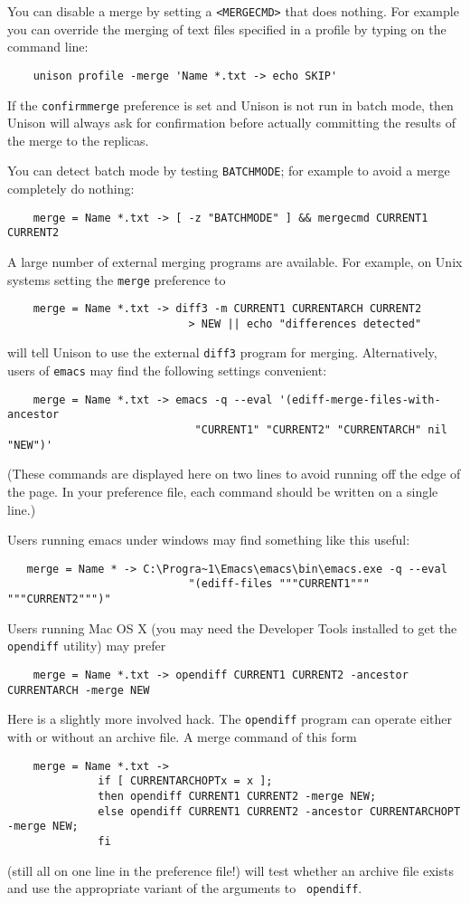 \documentclass{article}
\begin{document}
You can disable a merge by setting a \verb|<MERGECMD>| that does nothing.  For
example you can override the merging of text files specified in a profile by
typing on the command line:
\begin{verbatim}
    unison profile -merge 'Name *.txt -> echo SKIP'
\end{verbatim}

If the \verb|confirmmerge| preference is set and Unison is not run in
batch mode, then Unison will always ask for confirmation before
actually committing the results of the merge to the replicas.

You can detect batch mode by testing \verb|BATCHMODE|; for
example to avoid a merge completely do nothing:
\begin{verbatim}
    merge = Name *.txt -> [ -z "BATCHMODE" ] && mergecmd CURRENT1 CURRENT2
\end{verbatim}

A large number of external merging programs are available.
For example, on Unix systems setting the \verb|merge| preference to
\begin{verbatim}
    merge = Name *.txt -> diff3 -m CURRENT1 CURRENTARCH CURRENT2
                            > NEW || echo "differences detected"
\end{verbatim}
\noindent
will tell Unison to use the external \verb|diff3| program for merging.
%
Alternatively, users of \verb|emacs| may find the following settings convenient:
\begin{verbatim}
    merge = Name *.txt -> emacs -q --eval '(ediff-merge-files-with-ancestor
                             "CURRENT1" "CURRENT2" "CURRENTARCH" nil "NEW")'
\end{verbatim}
\noindent
(These commands are displayed here on two lines to avoid running off the
edge of the page.  In your preference file, each command should be written on a
single line.)

Users running emacs under windows may find something like this useful:
\begin{verbatim}
   merge = Name * -> C:\Progra~1\Emacs\emacs\bin\emacs.exe -q --eval
                            "(ediff-files """CURRENT1""" """CURRENT2""")"
\end{verbatim}

Users running Mac OS X (you may need the Developer Tools installed to get
the {\tt opendiff} utility) may prefer
\begin{verbatim}
    merge = Name *.txt -> opendiff CURRENT1 CURRENT2 -ancestor CURRENTARCH -merge NEW
\end{verbatim}
Here is a slightly more involved hack.  The {\tt opendiff} program can
operate either with or without an archive file.  A merge command of this
form
\begin{verbatim}
    merge = Name *.txt ->
              if [ CURRENTARCHOPTx = x ];
              then opendiff CURRENT1 CURRENT2 -merge NEW;
              else opendiff CURRENT1 CURRENT2 -ancestor CURRENTARCHOPT -merge NEW;
              fi
\end{verbatim}
(still all on one line in the preference file!) will test whether an archive
file exists and use the appropriate variant of the arguments to {\tt
  opendiff}.
\end{document}
